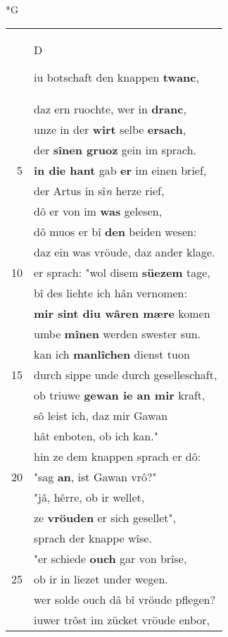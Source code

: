 \documentclass[8pt,a4paper,notitlepage]{article}
\begin{document}
\begin{table}[ht]
\begin{minipage}[t]{0.5\linewidth}
\small
\begin{center}*G
\end{center}
\begin{tabular}{rl}
 & \begin{large}D\end{large}iu botschaft den knappen \textbf{twanc},\\ 
 & daz ern ruochte, wer in \textbf{dranc},\\ 
 & unze in der \textbf{wirt} selbe \textbf{ersach},\\ 
 & der \textbf{sînen gruoz} gein im sprach.\\ 
5 & \textbf{in die hant} gab \textbf{er} im einen brief,\\ 
 & der Artus in sî\textit{n} herze rief,\\ 
 & dô er von im \textbf{was} gelesen,\\ 
 & dô muos er bî \textbf{den} beiden wesen:\\ 
 & daz ein was vröude, daz ander klage.\\ 
10 & er sprach: "wol disem \textbf{süezem} tage,\\ 
 & bî des liehte ich hân vernomen:\\ 
 & \textbf{mir sint diu wâren mære} komen\\ 
 & umbe \textbf{mînen} werden swester sun.\\ 
 & kan ich \textbf{manlîchen} dienst tuon\\ 
15 & durch sippe unde durch geselleschaft,\\ 
 & ob triuwe \textbf{gewan ie an mir} kraft,\\ 
 & sô leist ich, daz mir Gawan\\ 
 & hât enboten, ob ich kan."\\ 
 & hin ze dem knappen sprach er dô:\\ 
20 & "sag \textbf{an}, ist Gawan vrô?"\\ 
 & "jâ, hêrre, ob ir wellet,\\ 
 & ze \textbf{vröuden} er sich gesellet",\\ 
 & sprach der knappe wîse.\\ 
 & "er schiede \textbf{ouch} gar von brîse,\\ 
25 & ob ir in liezet under wegen.\\ 
 & wer solde ouch dâ bî vröude pflegen?\\ 
 & iuwer trôst im zücket vröude enbor,\\ 

\end{tabular}
\end{minipage}
\end{table}
\end{document}
